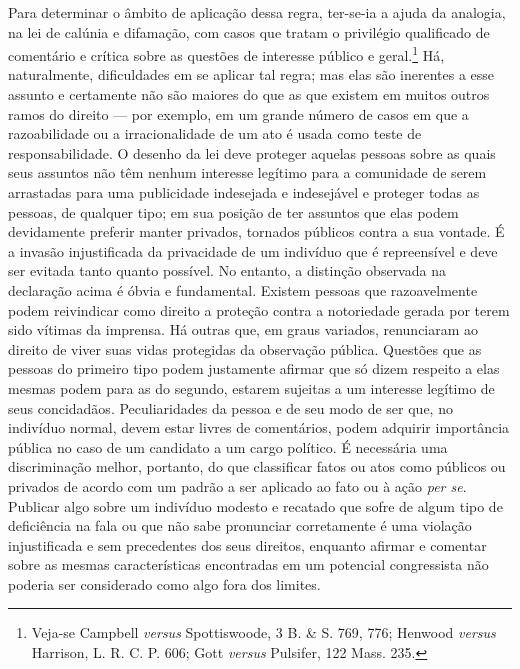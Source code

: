 Para determinar o âmbito de aplicação dessa regra, ter-se-ia a ajuda da
analogia, na lei de calúnia e difamação, com casos que tratam o
privilégio qualificado de comentário e crítica sobre as questões de
interesse público e geral.\footnote{Veja-se Campbell \emph{versus}
  Spottiswoode, 3 B. \& S. 769, 776; Henwood \emph{versus} Harrison, L.
  R. C. P. 606; Gott \emph{versus} Pulsifer, 122 Mass. 235.} Há,
naturalmente, dificuldades em se aplicar tal regra; mas elas são
inerentes a esse assunto e certamente não são maiores do que as que
existem em muitos outros ramos do direito --- por exemplo, em um grande
número de casos em que a razoabilidade ou a irracionalidade de um ato é
usada como teste de responsabilidade. O desenho da lei deve proteger
aquelas pessoas sobre as quais seus assuntos não têm nenhum interesse
legítimo para a comunidade de serem arrastadas para uma publicidade
indesejada e indesejável e proteger todas as pessoas, de qualquer tipo;
em sua posição de ter assuntos que elas podem devidamente preferir
manter privados, tornados públicos contra a sua vontade. É a invasão
injustificada da privacidade de um indivíduo que é repreensível e deve
ser evitada tanto quanto possível. No entanto, a distinção observada na
declaração acima é óbvia e fundamental. Existem pessoas que
razoavelmente podem reivindicar como direito a proteção contra a
notoriedade gerada por terem sido vítimas da imprensa. Há outras que, em
graus variados, renunciaram ao direito de viver suas vidas protegidas da
observação pública. Questões que as pessoas do primeiro tipo podem
justamente afirmar que só dizem respeito a elas mesmas podem para as do
segundo, estarem sujeitas a um interesse legítimo de seus concidadãos.
Peculiaridades da pessoa e de seu modo de ser que, no indivíduo normal,
devem estar livres de comentários, podem adquirir importância pública no
caso de um candidato a um cargo político. É necessária uma discriminação
melhor, portanto, do que classificar fatos ou atos como públicos ou
privados de acordo com um padrão a ser aplicado ao fato ou à ação
\emph{per se}. Publicar algo sobre um indivíduo modesto e recatado que
sofre de algum tipo de deficiência na fala ou que não sabe pronunciar
corretamente é uma violação injustificada e sem precedentes dos seus
direitos, enquanto afirmar e comentar sobre as mesmas características
encontradas em um potencial congressista não poderia ser considerado
como algo fora dos limites.

